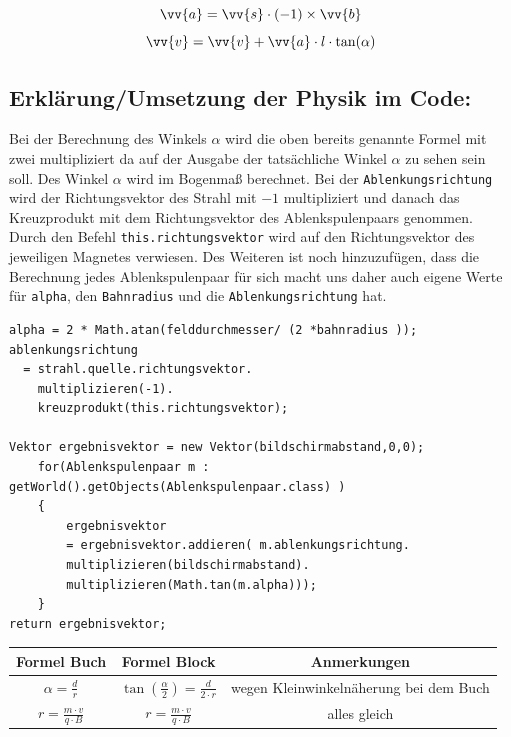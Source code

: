 \begin{equation}
    \label{eq:a}
    \vv{a} = \vv{s} \cdot (-1) \times \vv{b}
\end{equation}
\begin{equation}
    \label{eq:v}
    \vv{v} = \vv{v} + \vv{a} \cdot l \cdot \tan(\alpha)
\end{equation}

\subsection{Erklärung/Umsetzung der Physik im Code:}
 Bei der Berechnung des Winkels $\alpha$ wird die oben %
bereits genannte Formel mit zwei multipliziert da auf der Ausgabe der tatsächliche Winkel $\alpha$ zu sehen sein soll. Des Winkel $\alpha$ wird im Bogenmaß berechnet. Bei der \lstinline$Ablenkungsrichtung$ wird der Richtungsvektor des Strahl mit $-1$ multipliziert und danach das Kreuzprodukt mit dem Richtungsvektor des Ablenkspulenpaars genommen. Durch den Befehl \lstinline$this.richtungsvektor$ wird auf den Richtungsvektor des jeweiligen Magnetes verwiesen. Des Weiteren ist noch hinzuzufügen, dass die Berechnung jedes Ablenkspulenpaar für sich macht uns daher auch eigene Werte für \lstinline$alpha$, den \lstinline$Bahnradius$ und die \lstinline$Ablenkungsrichtung$ hat.
\begin{lstlisting}
alpha = 2 * Math.atan(felddurchmesser/ (2 *bahnradius ));
ablenkungsrichtung
  = strahl.quelle.richtungsvektor.
    multiplizieren(-1).
    kreuzprodukt(this.richtungsvektor);

Vektor ergebnisvektor = new Vektor(bildschirmabstand,0,0);
    for(Ablenkspulenpaar m : getWorld().getObjects(Ablenkspulenpaar.class) )
    {
        ergebnisvektor 
        = ergebnisvektor.addieren( m.ablenkungsrichtung.
        multiplizieren(bildschirmabstand).
        multiplizieren(Math.tan(m.alpha)));
    }
return ergebnisvektor;

\end{lstlisting}

\begin{tabular}{c|c|c}
     Formel Buch & Formel Block & Anmerkungen  \\
     \hline
    $\alpha = \frac{d}{r}$ &$\tan(\frac{\alpha}{2}) = \frac{d}{2\cdot r}$& wegen Kleinwinkelnäherung bei dem Buch \\
    \hline
   $r = \frac{m\cdot v}{q\cdot B}$  & $r = \frac{m\cdot v}{q\cdot B}$& alles gleich 
     
\end{tabular}













 
